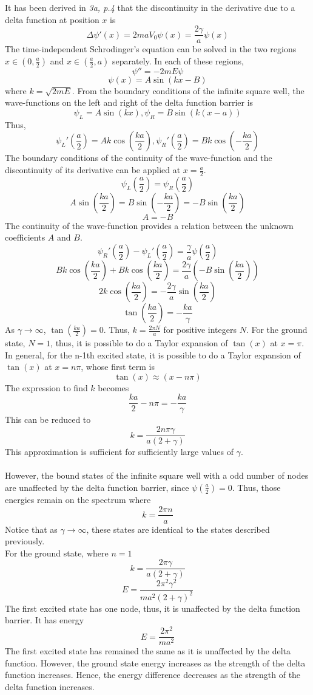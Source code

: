 \begin{sol}
It has been derived in \textit{3a, p.4} that the discontinuity in the derivative due to a delta function at position $x$ is 
$$\Delta\psi'(x)=2maV_0\psi(x)=\frac{2\gamma}{a}\psi(x)$$
The time-independent Schrodinger's equation can be solved in the two regions $x\in(0,\frac{a}{2})$ and $x\in(\frac{a}{2},a)$ separately. In each of these regions,
$$\psi''=-2mE\psi$$
$$\psi(x)=A\sin(kx-B)$$
where $k=\sqrt{2mE}$. From the boundary conditions of the infinite square well, the wave-functions on the left and right of the delta function barrier is
$$\psi_L=A\sin(kx), \psi_R=B\sin(k(x-a))$$ Thus,
$$\psi_L'\left(\frac{a}{2}\right)=Ak\cos\left(\frac{ka}{2}\right),\psi_R'\left(\frac{a}{2}\right)=Bk\cos\left(-\frac{ka}{2}\right)$$ The boundary conditions of the continuity of the wave-function and the discontinuity of its derivative can be applied at $x=\frac{a}{2}$.
$$\psi_L\left(\frac{a}{2}\right)=\psi_R\left(\frac{a}{2}\right)$$
$$A\sin\left(\frac{ka}{2}\right)=B\sin\left(-\frac{ka}{2}\right)=-B\sin\left(\frac{ka}{2}\right)$$
$$A=-B$$
The continuity of the wave-function provides a relation between the unknown coefficients $A$ and $B$. 
$$\psi_R'\left(\frac{a}{2}\right)-\psi_L'\left(\frac{a}{2}\right)=\frac{\gamma}{a}\psi\left(\frac{a}{2}\right)$$
$$Bk\cos\left(\frac{ka}{2}\right)+Bk\cos\left(\frac{ka}{2}\right)=\frac{2\gamma}{a}\left(-B\sin\left(\frac{ka}{2}\right)\right)$$
$$2k\cos\left(\frac{ka}{2}\right)=-\frac{2\gamma}{a}\sin\left(\frac{ka}{2}\right)$$
$$\tan\left(\frac{ka}{2}\right)=-\frac{ka}{\gamma}$$ As $\gamma\to\infty$, $\tan(\frac{ka}{2})=0$. Thus, $k=\frac{2\pi N}{a}$ for positive integers $N$. For the ground state, $N=1$, thus, it is possible to do a Taylor expansion of $\tan(x)$ at $x=\pi$. In general, for the n-1th excited state, it is possible to do a Taylor expansion of $\tan(x)$ at $x=n\pi$, whose first term is
$$\tan(x)\approx(x-n\pi)$$
The expression to find $k$ becomes
$$\frac{ka}{2}-n\pi=-\frac{ka}{\gamma}$$ 
This can be reduced to
$$k=\frac{2n\pi\gamma}{a(2+\gamma)}$$
This approximation is sufficient for sufficiently large values of $\gamma$.\\
\\
However, the bound states of the infinite square well with a odd number of nodes are unaffected by the delta function barrier, since $\psi(\frac{a}{2})=0$. Thus, those energies remain on the spectrum where
$$k=\frac{2\pi n}{a}$$
Notice that as $\gamma\to\infty$, these states are identical to the states described previously.\\
For the ground state, where $n=1$
$$k=\frac{2\pi\gamma}{a(2+\gamma)}$$
$$E=\frac{2\pi^2\gamma^2}{ma^2(2+\gamma)^2}$$ The first excited state has one node, thus, it is unaffected by the delta function barrier. It has energy
$$E=\frac{2\pi^2}{ma^2}$$
The first excited state has remained the same as it is unaffected by the delta function. However, the ground state energy increases as the strength of the delta function increases. Hence, the energy difference decreases as the strength of the delta function increases. 
\end{sol}